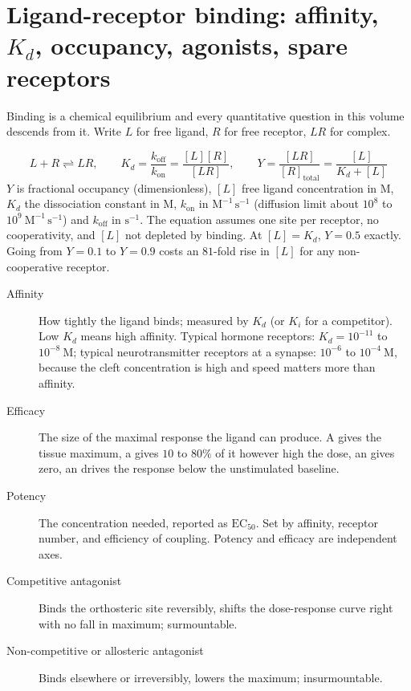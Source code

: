 \section{Ligand-receptor binding: affinity, $K_d$, occupancy, agonists, spare receptors}

Binding is a chemical equilibrium and every quantitative question in this volume
descends from it. Write $L$ for free ligand, $R$ for free receptor, $LR$ for complex.

\begin{keybox}[title={MEMORIZE: the occupancy equation}]
\[
L + R \rightleftharpoons LR, \qquad
K_d=\frac{k_{\text{off}}}{k_{\text{on}}}=\frac{[L][R]}{[LR]},\qquad
Y=\frac{[LR]}{[R]_{\text{total}}}=\frac{[L]}{K_d+[L]}
\]
$Y$ is fractional occupancy (dimensionless), $[L]$ free ligand concentration in
$\mathrm{M}$, $K_d$ the dissociation constant in $\mathrm{M}$, $k_{\text{on}}$ in
$\mathrm{M^{-1}\,s^{-1}}$ (diffusion limit about $10^{8}$ to
$10^{9}\ \mathrm{M^{-1}\,s^{-1}}$) and $k_{\text{off}}$ in $\mathrm{s^{-1}}$. The
equation assumes one site per receptor, no cooperativity, and $[L]$ not depleted by
binding. At $[L]=K_d$, $Y=0.5$ exactly. Going from $Y=0.1$ to $Y=0.9$ costs an
$81$-fold rise in $[L]$ for any non-cooperative receptor.
\end{keybox}

\begin{defbox}[title={DEFINITIONS: the pharmacology vocabulary}]
\begin{description}
\item[Affinity] How tightly the ligand binds; measured by $K_d$ (or $K_i$ for a
competitor). Low $K_d$ means high affinity. Typical hormone receptors:
$K_d = 10^{-11}$ to $10^{-8}\ \mathrm{M}$; typical neurotransmitter receptors at a
synapse: $10^{-6}$ to $10^{-4}\ \mathrm{M}$, because the cleft concentration is high
and speed matters more than affinity.
\item[Efficacy] The size of the maximal response the ligand can produce. A
 gives the tissue maximum, a  gives $10$ to
$80\%$ of it however high the dose, an  gives zero, an
 drives the response below the unstimulated baseline.
\item[Potency] The concentration needed, reported as $\mathrm{EC_{50}}$. Set by
affinity, receptor number, and efficiency of coupling. Potency and efficacy are
independent axes.
\item[Competitive antagonist] Binds the orthosteric site reversibly, shifts the
dose-response curve right with no fall in maximum; surmountable.
\item[Non-competitive or allosteric antagonist] Binds elsewhere or irreversibly,
lowers the maximum; insurmountable.
\end{description}
\end{defbox}

